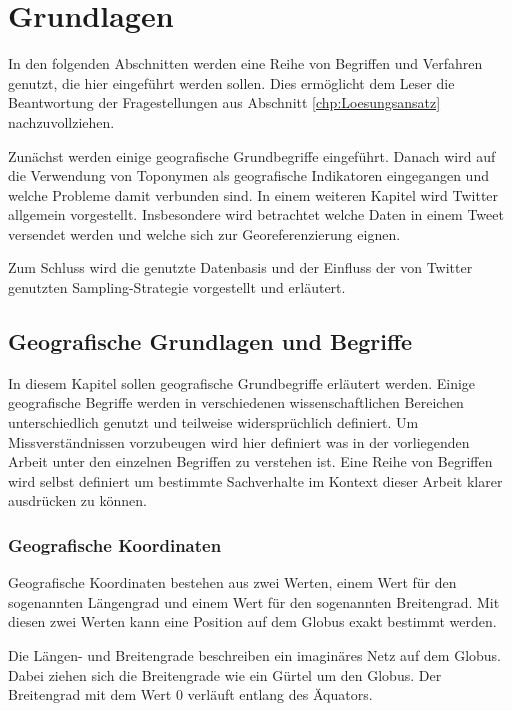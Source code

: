 \chapter{Grundlagen} \label{chp:Grundlagen}  
In den folgenden Abschnitten werden eine Reihe von Begriffen und Verfahren genutzt, die hier eingeführt werden sollen.     
Dies ermöglicht dem Leser die Beantwortung der Fragestellungen aus Abschnitt \ref{chp:Loesungsansatz} nachzuvollziehen.    
 
Zunächst werden einige geografische Grundbegriffe eingeführt. 
Danach wird auf die Verwendung von Toponymen als geografische Indikatoren eingegangen und welche Probleme damit verbunden sind.
In einem weiteren Kapitel wird Twitter allgemein vorgestellt.
Insbesondere wird betrachtet welche Daten in einem Tweet versendet werden und welche sich zur Georeferenzierung eignen. 

Zum Schluss wird die genutzte Datenbasis und der Einfluss der von Twitter genutzten Sampling-Strategie vorgestellt und erläutert.

\newpage

	\section{Geografische Grundlagen und Begriffe}
	
		In diesem Kapitel sollen geografische Grundbegriffe erläutert werden. 
		Einige geografische Begriffe werden in verschiedenen wissenschaftlichen Bereichen unterschiedlich genutzt und teilweise widersprüchlich definiert. 
		Um Missverständnissen vorzubeugen wird hier definiert was in der vorliegenden Arbeit unter den einzelnen Begriffen zu verstehen ist.
		Eine Reihe von Begriffen wird selbst definiert um bestimmte Sachverhalte im Kontext dieser Arbeit klarer ausdrücken zu können. 

		\subsection{Geografische Koordinaten}
			
			Geografische Koordinaten bestehen aus zwei Werten, einem Wert für den sogenannten Längengrad und einem Wert für den sogenannten Breitengrad.
			Mit diesen zwei Werten kann eine Position auf dem Globus exakt bestimmt werden.  
			
			Die Längen- und Breitengrade beschreiben ein imaginäres Netz auf dem Globus. 
			Dabei ziehen sich die Breitengrade wie ein Gürtel um den Globus.
			Der Breitengrad mit dem Wert 0 verläuft entlang des Äquators.

